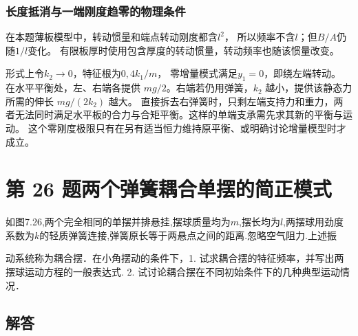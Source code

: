 \documentclass[UTF8,fontset=fandol,a4paper,11pt]{ctexart}
\newcommand{\tagline}[1]{\noindent{\small\color{muted}#1}\par}
\newcommand{\figcaption}[1]{\par\vspace{2pt}{\small\color{muted}#1}\par}
\begin{document}
\subsubsection*{长度抵消与一端刚度趋零的物理条件}
在本题薄板模型中，转动惯量和端点转动刚度都含$l^2$，
所以频率不含$l$；但$B/A$仍随$1/l$变化。
有限板厚时使用包含厚度的转动惯量，转动频率也随该惯量改变。

形式上令$k_2\to0$，特征根为$0,4k_1/m$，
零增量模式满足$y_1=0$，即绕左端转动。
在水平平衡处，左、右端各提供 $mg/2$。右端若仍用弹簧，$k_2$ 越小，提供该静态力所需的伸长 $mg/(2k_2)$ 越大。
直接拆去右弹簧时，只剩左端支持力和重力，两者无法同时满足水平板的合力与合矩平衡。这样的单端支承需先求其新的平衡与运动。
这个零刚度极限只有在另有适当恒力维持原平衡、或明确讨论增量模型时才成立。




\section*{第 26 题\quad 两个弹簧耦合单摆的简正模式}

\tagline{M-07-26}

如图7.26,两个完全相同的单摆并排悬挂,摆球质量均为\(m\),摆长均为\(l\),两摆球用劲度系数为\(k\)的轻质弹簧连接,弹簧原长等于两悬点之间的距离.忽略空气阻力.上述振

动系统称为耦合摆．在小角摆动的条件下，1.
试求耦合摆的特征频率，并写出两摆球运动方程的一般表达式. 2.
试讨论耦合摆在不同初始条件下的几种典型运动情况．

\begin{center}\begin{minipage}{\linewidth}\centering{}\figcaption{图 7.26}\end{minipage}\end{center}

\subsection*{解答}
\end{document}
